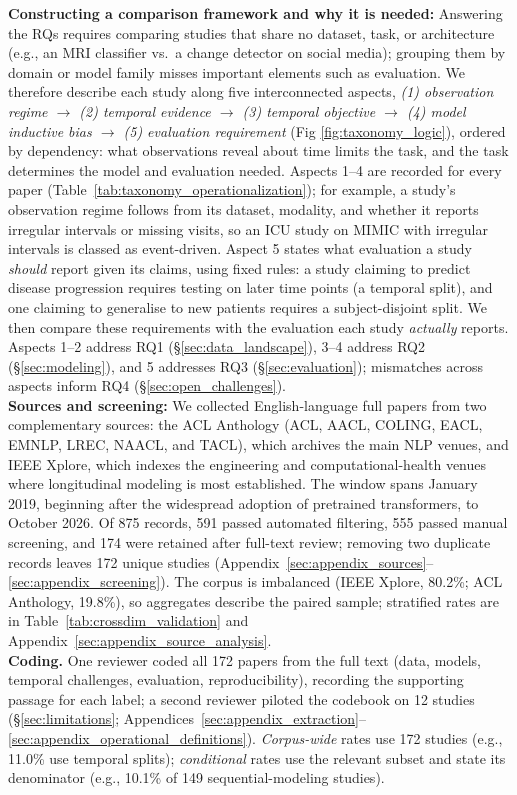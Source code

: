 \documentclass[11pt]{article}
\theoremstyle{plain}
\theoremstyle{definition}
\theoremstyle{remark}
\begin{document}
\noindent\textbf{Constructing a comparison framework and why it is needed:} Answering the RQs requires comparing studies that share no dataset, task, or architecture (e.g., an MRI classifier vs.\ a change detector on social media); grouping them by domain or model family misses important elements such as evaluation. We therefore describe each study along five interconnected aspects, \emph{(1) observation regime $\rightarrow$ (2) temporal evidence $\rightarrow$ (3) temporal objective $\rightarrow$ (4) model inductive bias $\rightarrow$ (5) evaluation requirement} (Fig \ref{fig:taxonomy_logic}), ordered by dependency: what observations reveal about time limits the task, and the task determines the model and evaluation needed. Aspects 1--4 are  recorded for every paper (Table~\ref{tab:taxonomy_operationalization}); for example, a study's observation regime follows from its dataset, modality, and whether it reports irregular intervals or missing visits, so an ICU study on MIMIC with irregular intervals is classed as event-driven. Aspect 5 states what evaluation a study \emph{should} report given its claims, using fixed rules: a study claiming to predict disease progression requires testing on later time points (a temporal split), and one claiming to generalise to new patients requires a subject-disjoint split. We then compare these requirements with the evaluation each study \emph{actually} reports. Aspects 1--2 address RQ1 (\S\ref{sec:data_landscape}), 3--4 address RQ2 (\S\ref{sec:modeling}), and 5 addresses RQ3 (\S\ref{sec:evaluation}); mismatches across aspects inform RQ4 (\S\ref{sec:open_challenges}).\\
\noindent\textbf{Sources and screening:} We collected English-language full papers from two complementary sources: the ACL Anthology {\small (ACL, AACL, COLING, EACL, EMNLP, LREC, NAACL, and TACL)}, which archives the main NLP venues, and IEEE Xplore, which indexes the engineering and computational-health venues where longitudinal modeling is most established. The window spans January 2019, beginning after the widespread adoption of pretrained transformers, to October 2026. Of 875 records, 591 passed automated filtering, 555 passed manual screening, and 174 were retained after full-text review; removing two duplicate records leaves 172 unique studies (Appendix~\ref{sec:appendix_sources}--\ref{sec:appendix_screening}). The corpus is imbalanced (IEEE Xplore, 80.2\%; ACL Anthology, 19.8\%), so aggregates describe the paired sample; stratified rates are in Table~\ref{tab:crossdim_validation} and Appendix~\ref{sec:appendix_source_analysis}.\\
\noindent\textbf{Coding.} One reviewer coded all 172 papers from the full text (data, models, temporal challenges, evaluation, reproducibility), recording the supporting passage for each label; a second reviewer piloted the codebook on 12 studies (\S\ref{sec:limitations}; Appendices~\ref{sec:appendix_extraction}--\ref{sec:appendix_operational_definitions}). \emph{Corpus-wide} rates use 172 studies (e.g., 11.0\% use temporal splits); \emph{conditional} rates use the relevant subset and state its denominator (e.g., 10.1\% of 149 sequential-modeling studies).
\end{document}
